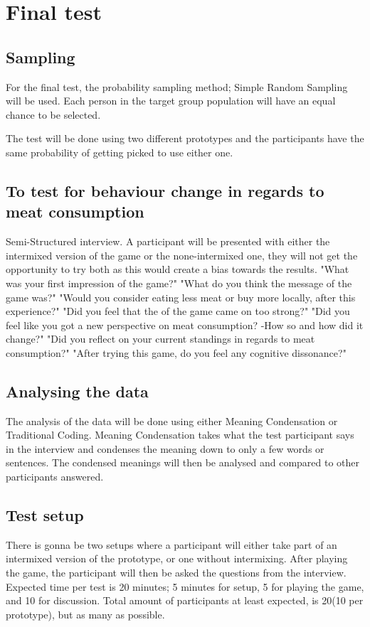     
    \section{Final test}
     \subsection{Sampling}
     For the final test, the probability sampling method; Simple Random Sampling will be used\cite{bjoernerBog}. Each person in the target group population will have an equal chance to be selected. 
     
     The test will be done using two different prototypes and the participants have the same probability of getting picked to use either one. 
    
    \subsection{To test for behaviour change in regards to meat consumption}
    Semi-Structured interview\cite{bjoernerBog}. A participant will be presented with either the intermixed version of the game or the none-intermixed one, they will not get the opportunity to try both as this would create a bias towards the results.
    "What was your first impression of the game?"
    "What do you think the message of the game was?"
    "Would you consider eating less meat or buy more locally, after this experience?"
    "Did you feel that the of the game came on too strong?"
    "Did you feel like you got a new perspective on meat consumption? -How so and how did it change?"
    "Did you reflect on your current standings in regards to meat consumption?"
    "After trying this game, do you feel any cognitive dissonance?"
    
    \subsection{Analysing the data}
    The analysis of the data will be done using either Meaning Condensation or Traditional Coding\cite{bjoernerBog}. Meaning Condensation takes what the test participant says in the interview and condenses the meaning down to only a few words or sentences. The condensed meanings will then be analysed and compared to other participants answered. 
    
    \subsection{Test setup}
    There is gonna be two setups where a participant will either take part of an intermixed version of the prototype, or one without intermixing. After playing the game, the participant will then be asked the questions from the interview. Expected time per test is 20 minutes; 5 minutes for setup, 5 for playing the game, and 10 for discussion. Total amount of participants at least expected, is 20(10 per prototype), but as many as possible.